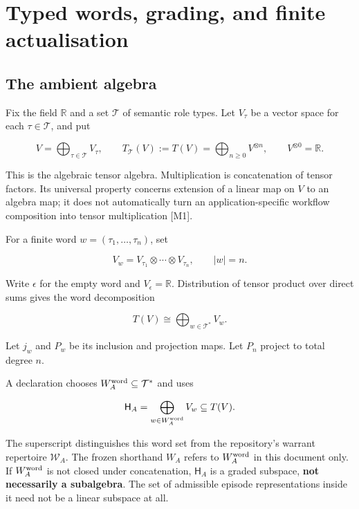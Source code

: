 \documentclass[11pt,a4paper]{article}
\begin{document}
\section{Typed words, grading, and finite
actualisation}\label{typed-words-grading-and-finite-actualisation}

\subsection{The ambient algebra}\label{the-ambient-algebra}

Fix the field \(\mathbb R\) and a set \(\mathcal T\) of semantic role
types. Let \(V_\tau\) be a vector space for each \(\tau\in\mathcal T\),
and put

\nopagebreak[4]

\[
V=\bigoplus_{\tau\in\mathcal T}V_\tau,
\qquad
T_{\mathcal T}(V):=T(V)=\bigoplus_{n\geq0}V^{\otimes n},
\qquad V^{\otimes0}=\mathbb R.
\]

This is the algebraic tensor algebra. Multiplication is concatenation of
tensor factors. Its universal property concerns extension of a linear
map on \(V\) to an algebra map; it does not automatically turn an
application-specific workflow composition into tensor multiplication
{[}M1{]}.

For a finite word \(w=(\tau_1,\ldots,\tau_n)\), set

\nopagebreak[4]

\[
V_w=V_{\tau_1}\otimes\cdots\otimes V_{\tau_n},\qquad |w|=n.
\]

Write \(\epsilon\) for the empty word and \(V_\epsilon=\mathbb R\).
Distribution of tensor product over direct sums gives the word
decomposition

\nopagebreak[4]

\[
T(V)\cong\bigoplus_{w\in\mathcal T^*}V_w.
\]

Let \(j_w\) and \(P_w\) be its inclusion and projection maps. Let
\(P_n\) project to total degree \(n\).

A declaration chooses \(W_A^{\rm word}\subseteq\mathcal T^*\) and uses

\nopagebreak[4]

\[
\mathsf H_A=\bigoplus_{w\in W_A^{\rm word}}V_w\subseteq T(V).
\]

The superscript distinguishes this word set from the repository's
warrant repertoire \(\mathcal W_A\). The frozen shorthand \(W_A\) refers
to \(W_A^{\rm word}\) in this document only. If \(W_A^{\rm word}\) is
not closed under concatenation, \(\mathsf H_A\) is a graded subspace,
\textbf{not necessarily a subalgebra}. The set of admissible episode
representations inside it need not be a linear subspace at all.
\end{document}
